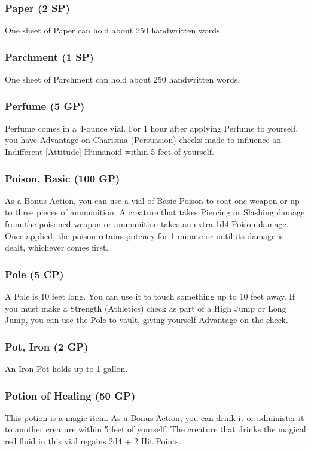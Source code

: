 \documentclass[10pt,a4paper,twoside,bg=print,twocolumn,openany,nodeprecatedcode]{dndbook}
\begin{document}
\subsubsection{Paper (2 SP)}
One sheet of Paper can hold about 250 handwritten words.

\subsubsection{Parchment (1 SP)}
One sheet of Parchment can hold about 250 handwritten words.

\subsubsection{Perfume (5 GP)}
Perfume comes in a 4-ounce vial. For 1 hour after applying Perfume to yourself, you have Advantage on Charisma (Persuasion) checks made to influence an Indifferent [Attitude] Humanoid within 5 feet of yourself.

\subsubsection{Poison, Basic (100 GP)}
As a Bonus Action, you can use a vial of Basic Poison to coat one weapon or up to three pieces of ammunition. A creature that takes Piercing or Slashing damage from the poisoned weapon or ammunition takes an extra 1d4 Poison damage. Once applied, the poison retains potency for 1 minute or until its damage is dealt, whichever comes first.

\subsubsection{Pole (5 CP)}
A Pole is 10 feet long. You can use it to touch something up to 10 feet away. If you must make a Strength (Athletics) check as part of a High Jump or Long Jump, you can use the Pole to vault, giving yourself Advantage on the check.

\subsubsection{Pot, Iron (2 GP)}
An Iron Pot holds up to 1 gallon.

\subsubsection{Potion of Healing (50 GP)}
This potion is a magic item. As a Bonus Action, you can drink it or administer it to another creature within 5 feet of yourself. The creature that drinks the magical red fluid in this vial regains 2d4 + 2 Hit Points.
\end{document}

